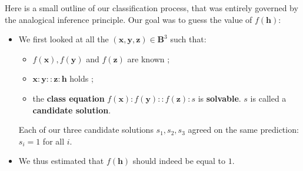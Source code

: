 Here is a small outline of our classification process, that was entirely
governed by the analogical inference principle. Our goal was to guess the value
of $f(\mathbf{h})$:

\begin{itemize}
  \item We first looked at all the $(\mathbf{x}, \mathbf{y}, \mathbf{z}) \in
    \mathbf{B}^3$ such that:
    \begin{itemize}
      \item $f(\mathbf{x}), f(\mathbf{y})$ and $f(\mathbf{z})$ are known ;
      \item $\mathbf{x}:\mathbf{y}::\mathbf{z}:\mathbf{h}$ holds ;
      \item the \textbf{class equation} $f(\mathbf{x}) :f(\mathbf{y}) ::
        f(\mathbf{z}) :s$ is \textbf{solvable}. $s$ is called a
        \textbf{candidate solution}.
    \end{itemize}
    Each of our three candidate solutions $s_1, s_2, s_3$ agreed on the same prediction:
    $s_i = 1$ for all $i$.
  \item We thus estimated that $f(\mathbf{h})$ should indeed be equal to $1$.
\end{itemize}


